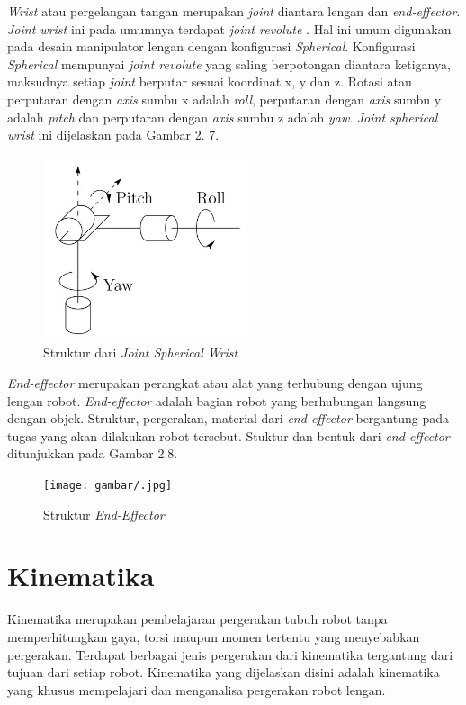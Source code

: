 \textit{Wrist} atau pergelangan tangan merupakan \textit{joint} diantara lengan dan \textit{end-effector}. \textit{Joint wrist} ini pada umumnya terdapat \textit{joint revolute} . Hal ini umum digunakan pada desain manipulator lengan dengan konfigurasi \textit{Spherical}. Konfigurasi \textit{Spherical} mempunyai \textit{joint revolute} yang saling berpotongan diantara ketiganya, maksudnya setiap \textit{joint} berputar sesuai koordinat x, y dan z. Rotasi atau perputaran dengan \textit{axis} sumbu x adalah \textit{roll}, perputaran dengan \textit{axis} sumbu y adalah \textit{pitch} dan perputaran dengan \textit{axis} sumbu z adalah \textit{yaw}. \textit{Joint spherical wrist} ini dijelaskan pada Gambar 2. 7.
	\begin{figure}[H]
	\centering
	\includegraphics[width=6cm]{gambar/wirst.jpg}
	\caption{Struktur dari \textit{Joint Spherical Wrist}}
\end{figure}


\textit{End-effector} merupakan perangkat atau alat yang terhubung dengan ujung lengan robot. \textit{End-effector} adalah bagian robot yang berhubungan langsung dengan objek. Struktur, pergerakan, material dari \textit{end-effector} bergantung pada tugas yang akan dilakukan robot tersebut. Stuktur dan bentuk dari \textit{end-effector} ditunjukkan pada Gambar 2.8.
	\begin{figure}[H]
	\centering
	\texttt{[image: gambar/.jpg]}
	\caption{Struktur \textit{End-Effector}}
	\end{figure}


\section{Kinematika}
Kinematika merupakan pembelajaran pergerakan tubuh robot tanpa memperhitungkan gaya, torsi maupun momen tertentu yang menyebabkan pergerakan. Terdapat berbagai jenis pergerakan dari kinematika tergantung dari tujuan dari setiap robot. Kinematika yang dijelaskan disini adalah kinematika yang khusus mempelajari dan menganalisa pergerakan robot lengan.  

